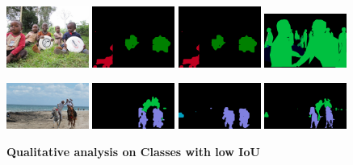 \documentclass{article}
\begin{document}
\begin{figure}[tbh!]
\begin{multicols}{8}
    {\includegraphics[width=0.24\textwidth]{figures/experiments/coco/image/0068.jpg}}
    {\includegraphics[width=0.24\textwidth]{figures/experiments/coco/orgckpt/0068.png}}
    {\includegraphics[width=0.24\textwidth]{figures/experiments/coco/nonnoisy/0068.png}}
    {\includegraphics[width=0.24\textwidth]{figures/experiments/coco/gt/000000004134_instanceTrainIds.png}}
    
    {\includegraphics[width=0.24\textwidth]{figures/experiments/coco/image/0072.jpg}}
    {\includegraphics[width=0.24\textwidth]{figures/experiments/coco/orgckpt/0072.png}}
    {\includegraphics[width=0.24\textwidth]{figures/experiments/coco/nonnoisy/0072.png}}
    {\includegraphics[width=0.24\textwidth]{figures/experiments/coco/gt/000000007281_instanceTrainIds.png}}
    
  \end{multicols}
  
  \caption[\textbf{Qualitative analysis on Classes with low IoU}]{\textbf{Qualitative analysis on Classes with low IoU}}
\end{figure}
\end{document}
